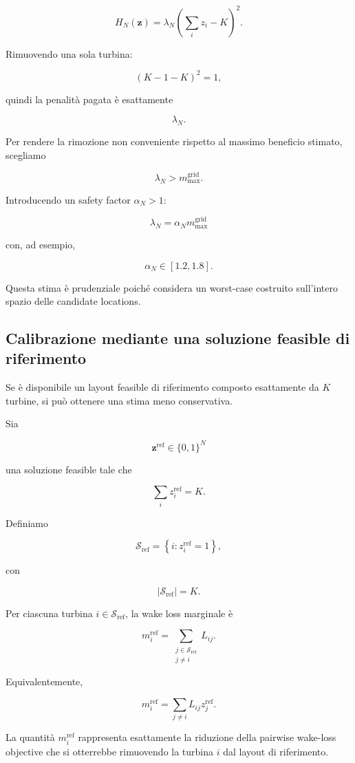 \documentclass[11pt,a4paper]{report}
\begin{document}
\[
H_N(\mathbf z)
=
\lambda_N
\left(
\sum_i z_i-K
\right)^2.
\]

Rimuovendo una sola turbina:

\[
(K-1-K)^2=1,
\]

quindi la penalità pagata è esattamente

\[
\lambda_N.
\]

Per rendere la rimozione non conveniente rispetto al massimo beneficio
stimato, scegliamo

\[
\lambda_N
>
m_{\max}^{\mathrm{grid}}.
\]

Introducendo un safety factor $\alpha_N>1$:

\[
\boxed{
\lambda_N
=
\alpha_N
m_{\max}^{\mathrm{grid}}
}
\]

con, ad esempio,

\[
\alpha_N\in[1.2,1.8].
\]

Questa stima è prudenziale poiché considera un worst-case costruito
sull'intero spazio delle candidate locations.

\subsection{Calibrazione mediante una soluzione feasible di riferimento}

Se è disponibile un layout feasible di riferimento composto esattamente
da $K$ turbine, si può ottenere una stima meno conservativa.

Sia

\[
\mathbf z^{\mathrm{ref}}
\in
\{0,1\}^{N}
\]

una soluzione feasible tale che

\[
\sum_i z_i^{\mathrm{ref}}=K.
\]

Definiamo

\[
\mathcal S_{\mathrm{ref}}
=
\left\{
i:z_i^{\mathrm{ref}}=1
\right\},
\]

con

\[
|\mathcal S_{\mathrm{ref}}|=K.
\]

Per ciascuna turbina $i\in\mathcal S_{\mathrm{ref}}$, la wake loss
marginale è

\[
m_i^{\mathrm{ref}}
=
\sum_{\substack{
j\in\mathcal S_{\mathrm{ref}}\\
j\neq i
}}
L_{ij}.
\]

Equivalentemente,

\[
m_i^{\mathrm{ref}}
=
\sum_{j\neq i}
L_{ij}z_j^{\mathrm{ref}}.
\]

La quantità $m_i^{\mathrm{ref}}$ rappresenta esattamente la riduzione
della pairwise wake-loss objective che si otterrebbe rimuovendo la turbina
$i$ dal layout di riferimento.
\end{document}
